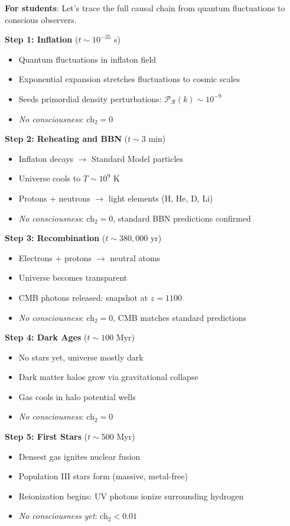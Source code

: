 \begin{keyidea}
\textbf{For students}: Let's trace the full causal chain from quantum fluctuations to conscious observers.

\textbf{Step 1: Inflation} ($t \sim 10^{-35}$ s)
\begin{itemize}
\item Quantum fluctuations in inflaton field
\item Exponential expansion stretches fluctuations to cosmic scales
\item Seeds primordial density perturbations: $\mathcal{P}_\mathcal{R}(k) \sim 10^{-9}$
\item \textit{No consciousness}: ch$_2 = 0$
\end{itemize}

\textbf{Step 2: Reheating and BBN} ($t \sim 3$ min)
\begin{itemize}
\item Inflaton decays $\to$ Standard Model particles
\item Universe cools to $T \sim 10^9$ K
\item Protons + neutrons $\to$ light elements (H, He, D, Li)
\item \textit{No consciousness}: ch$_2 = 0$, standard BBN predictions confirmed
\end{itemize}

\textbf{Step 3: Recombination} ($t \sim 380{,}000$ yr)
\begin{itemize}
\item Electrons + protons $\to$ neutral atoms
\item Universe becomes transparent
\item CMB photons released: snapshot at $z = 1100$
\item \textit{No consciousness}: ch$_2 = 0$, CMB matches standard predictions
\end{itemize}

\textbf{Step 4: Dark Ages} ($t \sim 100$ Myr)
\begin{itemize}
\item No stars yet, universe mostly dark
\item Dark matter halos grow via gravitational collapse
\item Gas cools in halo potential wells
\item \textit{No consciousness}: ch$_2 = 0$
\end{itemize}

\textbf{Step 5: First Stars} ($t \sim 500$ Myr)
\begin{itemize}
\item Densest gas ignites nuclear fusion
\item Population III stars form (massive, metal-free)
\item Reionization begins: UV photons ionize surrounding hydrogen
\item \textit{No consciousness yet}: ch$_2 < 0.01$
\end{itemize}


\end{keyidea}
